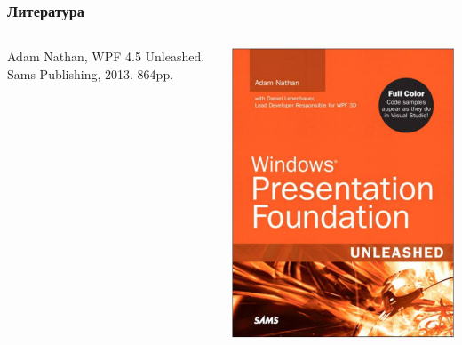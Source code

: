 \documentclass[xetex,mathserif,serif]{beamer}
\begin{document}
	\begin{frame}
		\frametitle{Литература}
		\begin{columns}
			\begin{column}{0.7\textwidth}
				Adam Nathan, WPF 4.5 Unleashed. Sams Publishing, 2013. 864pp.
				\vspace{3cm}
			\end{column}
			\begin{column}{0.3\textwidth}
				\begin{center}
					\includegraphics[width=\textwidth]{wpfBookCover.png}
				\end{center}
			\end{column}
		\end{columns}
	\end{frame}
\end{document}
